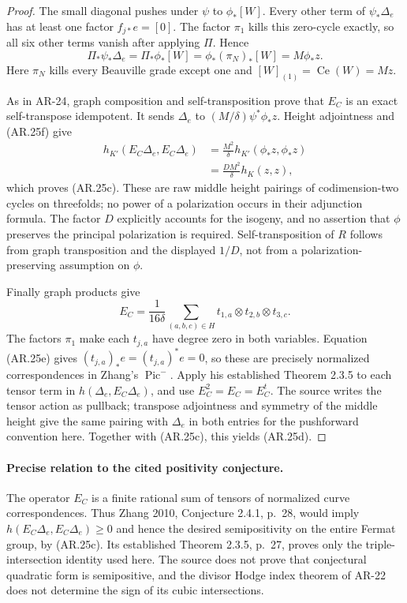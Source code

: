 \begin{proof}
The small diagonal pushes under $\psi$ to $\phi_*[W]$.  Every
other term of $\psi_*\Delta_e$ has at least one factor
$f_{j*}e=[0]$.  The factor $\pi_1$ kills this zero-cycle exactly,
so all six other terms vanish after applying $\Pi$.  Hence
\[
 \Pi_*\psi_*\Delta_e=\Pi_*\phi_*[W]
      =\phi_*(\pi_N)_*[W]=M\phi_*z.
\]
Here $\pi_N$ kills every Beauville grade except one and
$[W]_{(1)}=\operatorname{Ce}(W)=Mz$.

As in AR-24, graph composition and self-transposition prove that
$E_C$ is an exact self-transpose idempotent.  It sends $\Delta_e$
to $(M/\delta)\psi^*\phi_*z$.  Height adjointness and (AR.25f)
give
\[
 \begin{split}
 h_{K'}(E_C\Delta_e,E_C\Delta_e)
 &=\frac{M^2}{\delta}
       h_{K'}(\phi_*z,\phi_*z)\\
 &=\frac{D M^2}{\delta}h_K(z,z),
 \end{split}
\]
which proves (AR.25c).  These are raw middle height pairings of
codimension-two cycles on threefolds; no power of a polarization
occurs in their adjunction formula.  The factor $D$ explicitly
accounts for the isogeny, and no assertion that $\phi$ preserves
the principal polarization is required.  Self-transposition of
$R$ follows from graph transposition and the displayed $1/D$,
not from a polarization-preserving assumption on $\phi$.

Finally graph products give
\[
 E_C=\frac1{16\delta}\sum_{(a,b,c)\in H}
       t_{1,a}\otimes t_{2,b}\otimes t_{3,c}.            \tag{AR.25g}
\]
The factors $\pi_1$ make each $t_{j,a}$ have degree zero in
both variables.  Equation (AR.25e) gives
$(t_{j,a})_*e=(t_{j,a})^*e=0$, so these are precisely
normalized correspondences in Zhang's $\operatorname{Pic}^{-}$.
Apply his established Theorem 2.3.5 to each tensor term in
$h(\Delta_e,E_C\Delta_e)$, and use $E_C^2=E_C=E_C^t$.
The source writes the tensor action as pullback; transpose
adjointness and symmetry of the middle height give the same
pairing with $\Delta_e$ in both entries for the pushforward
convention here.
Together with (AR.25c), this yields (AR.25d).
\end{proof}

\paragraph{Precise relation to the cited positivity conjecture.}
The operator $E_C$ is a finite rational sum of tensors of normalized
curve correspondences.  Thus Zhang 2010, Conjecture 2.4.1, p.~28,
would imply $h(E_C\Delta_e,E_C\Delta_e)\ge0$ and hence the desired
semipositivity on the entire Fermat group, by (AR.25c).  Its
established Theorem 2.3.5, p.~27, proves only the triple-intersection
identity used here.  The source does not prove that conjectural
quadratic form is semipositive, and the divisor Hodge index theorem
of AR-22 does not determine the sign of its cubic intersections.

